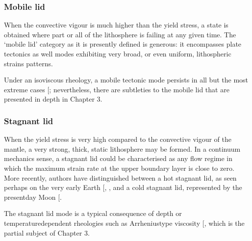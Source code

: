\documentclass[letterpaper,10pt,english]{jupyterBook}
\begin{document}
\subsubsection{Mobile lid}
\label{\detokenize{content/chapter_01_background/main:mobile-lid}}
\sphinxAtStartPar
When the convective vigour is much higher than the yield stress, a state is obtained where part or all of the lithosphere is failing at any given time. The ‘mobile lid’ category as it is presently defined is generous: it encompasses plate tectonics as well modes exhibiting very broad, or even uniform, lithospheric strains patterns.

\sphinxAtStartPar
Under an isoviscous rheology, a mobile tectonic mode persists in all but the most extreme cases {[}\sphinxcite{references:id392}{]}; nevertheless, there are subtleties to the mobile lid that are presented in depth in Chapter 3.


\subsubsection{Stagnant lid}
\label{\detokenize{content/chapter_01_background/main:stagnant-lid}}
\sphinxAtStartPar
When the yield stress is very high compared to the convective vigour of the mantle, a very strong, thick, static lithosphere may be formed. In a continuum mechanics sense, a stagnant lid could be characterised as any flow regime in which the maximum strain rate at the upper boundary layer is close to zero. More recently, authors have distinguished between a hot stagnant lid, as seen perhaps on the very early Earth {[}, \sphinxcite{references:id441}{]}, and a cold stagnant lid, represented by the present\sphinxhyphen{}day Moon {[}\sphinxcite{references:id513}{]}.

\sphinxAtStartPar
The stagnant lid mode is a typical consequence of depth\sphinxhyphen{} or temperature\sphinxhyphen{}dependent rheologies such as Arrhenius\sphinxhyphen{}type viscosity {[}\sphinxcite{references:id380}{]}, which is the partial subject of Chapter 3.
\end{document}
